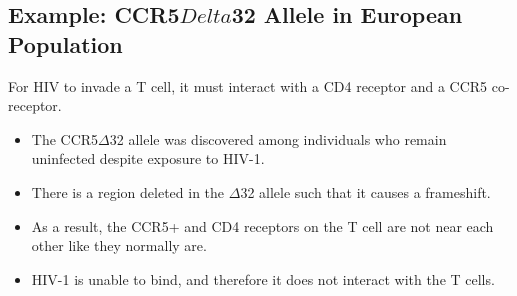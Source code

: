\documentclass[10pt]{article}
\begin{document}
\subsection*{Example: CCR5$Delta$32 Allele in European Population}
For HIV to invade a T cell, it must interact with a CD4 receptor and a CCR5 co-receptor.
\begin{itemize}
	\item The CCR5$\Delta$32 allele was discovered among individuals who remain uninfected despite exposure to HIV-1.
	\item There is a region deleted in the $\Delta$32 allele such that it causes a frameshift.
	\item As a result, the CCR5+ and CD4 receptors on the T cell are not near each other like they normally are.
	\item HIV-1 is unable to bind, and therefore it does not interact with the T cells.
\end{itemize}
\end{document}
